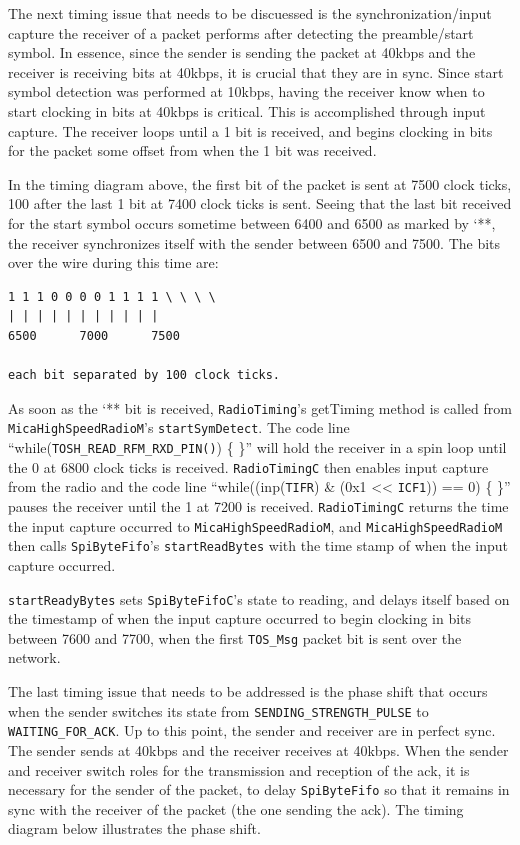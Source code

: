 \documentclass[11pt]{article}
\begin{document}
The next timing issue that needs to be discuessed is the
synchronization/input capture the receiver of a packet performs after
detecting the preamble/start symbol. In essence, since the sender is
sending the packet at 40kbps and the receiver is receiving bits at
40kbps, it is crucial that they are in sync. Since start symbol
detection was performed at 10kbps, having the receiver know when to
start clocking in bits at 40kbps is critical. This is accomplished
through input capture. The receiver loops until a 1 bit is received,
and begins clocking in bits for the packet some offset from when the 1
bit was received.

In the timing diagram above, the first bit of the packet is sent at
7500 clock ticks, 100 after the last 1 bit at 7400 clock ticks is sent. Seeing
that the last bit received for the start symbol occurs sometime
between 6400 and 6500 as marked by `**, the receiver synchronizes
itself with the sender between 6500 and 7500.  The bits over the wire
during this time are:

\small
\begin{verbatim}
1 1 1 0 0 0 0 1 1 1 1 \ \ \ \
| | | | | | | | | | |
6500      7000      7500

each bit separated by 100 clock ticks.
\end{verbatim}
\normalsize

As soon as the `** bit is received, {\tt RadioTiming}'s getTiming method is
called from \\{\tt MicaHighSpeedRadioM}'s {\tt startSymDetect}. The code line
``while({\tt TOSH\_READ\_RFM\_RXD\_PIN()}) \{ \}'' will hold the receiver in a
spin loop until the 0 at 6800 clock ticks is received.  {\tt RadioTimingC}
then enables input capture from the radio and the code line
``while((inp({\tt TIFR}) \& (0x1 << {\tt ICF1})) == 0) \{ \}'' pauses the receiver
until the 1 at 7200 is received. {\tt RadioTimingC} returns
the time the input capture occurred to {\tt MicaHighSpeedRadioM}, and
{\tt MicaHighSpeedRadioM} then calls {\tt SpiByteFifo}'s {\tt startReadBytes} with the time stamp of
when the input capture occurred.

{\tt startReadyBytes} sets {\tt SpiByteFifoC}'s state to reading, and delays
itself based on the timestamp of when the input capture occurred to
begin clocking in bits between 7600 and 7700, when the first {\tt TOS\_Msg} packet bit
is sent over the network.

The last timing issue that needs to be addressed is the phase shift that
occurs when the sender switches its state from {\tt SENDING\_STRENGTH\_PULSE}
to {\tt WAITING\_FOR\_ACK}. Up to this point, the sender and receiver are in
perfect sync. The sender sends at 40kbps and the receiver receives at 40kbps. When the
sender and receiver switch roles for the transmission and reception of
the ack, it is necessary for the sender of the packet, to delay
{\tt SpiByteFifo} so that it remains in sync with the receiver of the packet
(the one sending the ack).  The timing diagram below illustrates the
phase shift.
\end{document}
